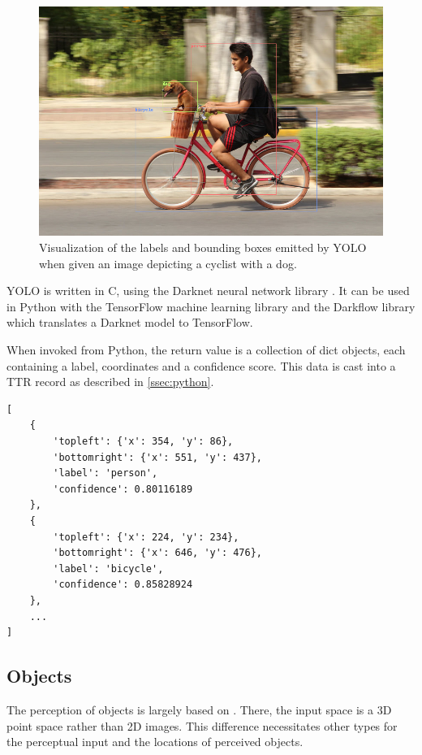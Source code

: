 \begin{figure}[h]
\label{fig:dogbike_annotated}
\includegraphics[width=\textwidth]{dogbike_annotated}
\centering
\caption{Visualization of the labels and bounding boxes emitted by YOLO when given an image depicting a cyclist with a dog.}
\end{figure}

YOLO is written in C, using the Darknet neural network library \citep{darknet13}.
It can be used in Python with the TensorFlow machine learning library and the Darkflow library which translates a Darknet model to TensorFlow.

When invoked from Python, the return value is a collection of dict objects, each containing a label, coordinates and a confidence score.
This data is cast into a TTR record as described in \autoref{ssec:python}.

\begin{lstlisting}[label=lst:yolo_out, caption=Example output of YOLO invocation]
[
	{
		'topleft': {'x': 354, 'y': 86},
		'bottomright': {'x': 551, 'y': 437},
		'label': 'person',
		'confidence': 0.80116189
	},
	{
		'topleft': {'x': 224, 'y': 234},
		'bottomright': {'x': 646, 'y': 476},
		'label': 'bicycle',
		'confidence': 0.85828924
	},
	...
]
\end{lstlisting}



\subsection{Objects}

The perception of objects is largely based on \cite{lspc}.
There, the input space is a 3D point space rather than 2D images.
This difference necessitates other types for the perceptual input and the locations of perceived objects.

